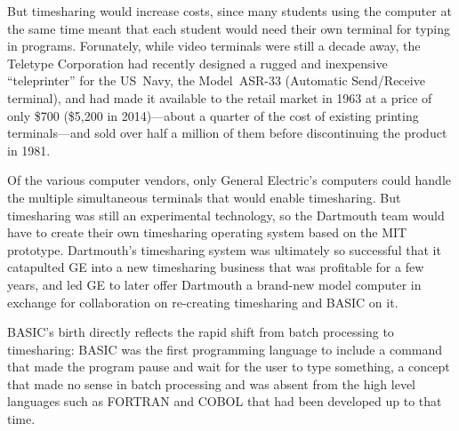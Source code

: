 But timesharing would increase costs, since
many students using the computer at the same time meant that each student
would need their own terminal for typing in programs.
Forunately, while video terminals were still a decade away, 
the Teletype Corporation had recently designed a rugged and
inexpensive ``teleprinter'' for the US~Navy, the Model~ASR-33 (Automatic
Send/Receive terminal), and had made it
available to the retail market in 1963 at a price of only \$700 (\$5,200
in 2014)---about a quarter of the cost of existing printing
terminals---and sold over
half a million of them before discontinuing the product in 1981.

Of the various
computer vendors, only General Electric's computers could handle the
multiple simultaneous terminals that would enable
timesharing. 
But timesharing was still an experimental technology, so the Dartmouth
team would have to create their own
timesharing operating system based on the MIT prototype.  
Dartmouth's timesharing system was ultimately so successful that it
catapulted GE into a new timesharing business that was profitable for a
few years, and led GE to later offer Dartmouth a brand-new model computer in
exchange for collaboration on re-creating timesharing and BASIC on it.

BASIC's birth directly reflects the rapid shift from batch processing to
timesharing: 
BASIC was the first programming language to include a command that made
the program pause and wait for the user to type
something, a concept that made no sense in batch processing and was
absent from the high level languages such as FORTRAN and COBOL that had
been developed up to that time.
 





